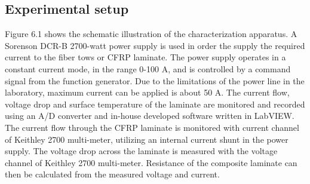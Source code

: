 \subsection{Experimental setup}

Figure 6.1 shows the schematic illustration of the characterization apparatus. A Sorenson DCR-B 2700-watt power supply is used in order the supply the required current to the fiber tows or CFRP laminate. The power supply operates in a constant current mode, in the range 0-100 A, and is controlled by a command signal from the function generator. Due to the limitations of the power line in the laboratory, maximum current can be applied is about 50 A. The current flow, voltage drop and surface temperature of the laminate are monitored and recorded using an A/D converter and in-house developed software written in LabVIEW. The current flow through the CFRP laminate is monitored with current channel of Keithley 2700 multi-meter, utilizing an internal current shunt in the power supply. The voltage drop across the laminate is measured with the voltage channel of Keithley 2700 multi-meter. Resistance of the composite laminate can then be calculated from the measured voltage and current.